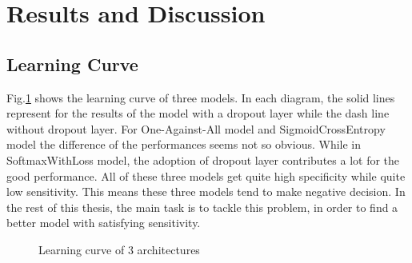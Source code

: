 \section{Results and Discussion}
\subsection{Learning Curve}
Fig.\ref{fig:learningcurve} shows the learning curve of three models. In each  diagram, the solid lines represent for the results of the model with a dropout layer while the dash line without dropout layer.
For One-Against-All model and SigmoidCrossEntropy model the difference of the performances seems not so obvious. While in SoftmaxWithLoss model, the adoption of dropout layer contributes a lot for the good performance.
All of these three models get quite high specificity while quite low sensitivity. This means these three models tend to make negative decision. In the rest of this thesis, the main task is to tackle this problem, in order to find a better model with satisfying sensitivity. 
\begin{figure}
\hfill
{}
\hfill
{}
\caption{Learning curve of 3 architectures}
\label{fig:learningcurve}
\end{figure}
